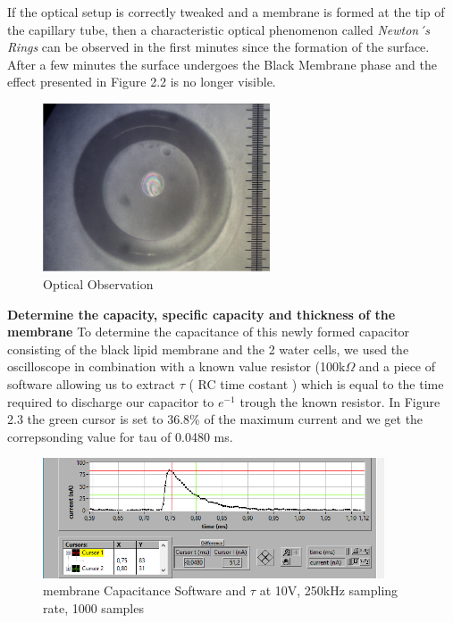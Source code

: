 \documentclass[a4paper,english,12pt,bibliography=totoc]{scrreprt}
\begin{document}
If the optical setup is correctly tweaked and a membrane is formed at the tip of the capillary tube, then a characteristic optical phenomenon called \textit{Newton´s Rings} can be observed in the first minutes since the formation of the surface. After a few minutes the surface undergoes the Black Membrane phase and the effect presented in Figure 2.2 is no longer visible.

\begin{figure}[H]
    \centering
    \includegraphics[width = 0.6\textwidth]{Group 8/Interference.PNG}
    \caption{Optical Observation}
    \label{fig:enter-label}
\end{figure}

\textbf{Determine the capacity, specific capacity and thickness of the membrane}
To determine the capacitance of this newly formed capacitor consisting of the black lipid membrane and the 2 water cells, we used the oscilloscope in combination with a known value resistor (100k$\Omega$ and a piece of software allowing us to extract $\tau$ ( RC time costant ) which is equal to the time required to discharge our capacitor to \( e^{-1} \)  trough the known resistor. In Figure 2.3 the green cursor is set to 36.8\% of the maximum current and we get the correpsonding value for tau of 0.0480 ms.

\begin{figure}[H]
    \centering
    \includegraphics[width = 0.9\textwidth]{Group 8/Capacitance1.PNG}
    \caption{membrane Capacitance Software and $\tau$ at 10V, 250kHz sampling rate, 1000 samples}
    \label{fig:enter-label}
\end{figure}
\end{document}

